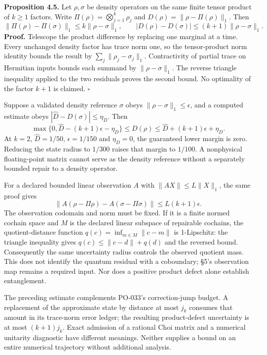 \documentclass[
  11pt,
]{article}
\begin{document}
\textbf{Proposition 4.5.} Let \(\rho,\sigma\) be density operators on the same finite tensor product of \(k\ge1\) factors. Write \(\Pi(\rho)=\bigotimes_{j=1}^k\rho_j\) and \(D(\rho)=\|\rho-\Pi(\rho)\|_1\). Then
\[
\|\Pi(\rho)-\Pi(\sigma)\|_1\le k\|\rho-\sigma\|_1,
\qquad
|D(\rho)-D(\sigma)|\le(k+1)\|\rho-\sigma\|_1.
\]
\textbf{Proof.} Telescope the product difference by replacing one marginal at a time. Every unchanged density factor has trace norm one, so the tensor-product norm identity bounds the result by \(\sum_j\|\rho_j-\sigma_j\|_1\). Contractivity of partial trace on Hermitian inputs bounds each summand by \(\|\rho-\sigma\|_1\). The reverse triangle inequality applied to the two residuals proves the second bound. No optimality of the factor \(k+1\) is claimed. \(\square\)

Suppose a validated density reference \(\sigma\) obeys
\(\|\rho-\sigma\|_1\le\epsilon\), and a computed estimate obeys
\(|\widehat D-D(\sigma)|\le\eta_D\). Then
\[
\max\{0,\widehat D-(k+1)\epsilon-\eta_D\}
\le D(\rho)\le
\widehat D+(k+1)\epsilon+\eta_D.
\]
At \(k=2\), \(\widehat D=1/50\), \(\epsilon=1/150\) and \(\eta_D=0\), the guaranteed lower margin is zero. Reducing the state radius to \(1/300\) raises that margin to \(1/100\). A nonphysical floating-point matrix cannot serve as the density reference without a separately bounded repair to a density operator.

For a declared bounded linear observation \(A\) with
\(\|AX\|\le L\|X\|_1\), the same proof gives
\[
\|A(\rho-\Pi\rho)-A(\sigma-\Pi\sigma)\|
\le L(k+1)\epsilon.
\]
The observation codomain and norm must be fixed. If it is a finite normed cochain space and \(M\) is the declared linear subspace of repairable cochains, the quotient-distance function
\(q(c)=\inf_{m\in M}\|c-m\|\) is 1-Lipschitz: the triangle inequality gives \(q(c)\le\|c-d\|+q(d)\) and the reversed bound. Consequently the same uncertainty radius controls the observed quotient mass. This does not identify the quantum residual with a coboundary; §5's observation map remains a required input. Nor does a positive product defect alone establish entanglement.

The preceding estimate complements PO-033's correction-jump budget. A replacement of the approximate state by distance at most \(j_k\) consumes that amount in its trace-norm error ledger; the resulting product-defect uncertainty is at most \((k+1)j_k\). Exact admission of a rational Choi matrix and a numerical unitarity diagnostic have different meanings. Neither supplies a bound on an entire numerical trajectory without additional analysis.
\end{document}
